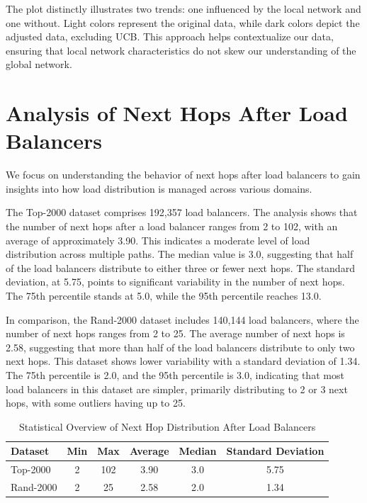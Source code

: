 \documentclass[12pt]{cwru_thesis}
\begin{document}
The plot distinctly illustrates two trends: one influenced by the local network and one without. Light colors represent the original data, while dark colors depict the adjusted data, excluding UCB. This approach helps contextualize our data, ensuring that local network characteristics do not skew our understanding of the global network.





\section{Analysis of Next Hops After Load Balancers}

We focus on understanding the behavior of next hops after load balancers to gain insights into how load distribution is managed across various domains. 

The Top-2000 dataset comprises 192,357 load balancers. The analysis shows that the number of next hops after a load balancer ranges from 2 to 102, with an average of approximately 3.90. This indicates a moderate level of load distribution across multiple paths. The median value is 3.0, suggesting that half of the load balancers distribute to either three or fewer next hops. The standard deviation, at 5.75, points to significant variability in the number of next hops. The 75th percentile stands at 5.0, while the 95th percentile reaches 13.0.

In comparison, the Rand-2000 dataset includes 140,144 load balancers, where the number of next hops ranges from 2 to 25. The average number of next hops is 2.58, suggesting that more than half of the load balancers distribute to only two next hops. This dataset shows lower variability with a standard deviation of 1.34. The 75th percentile is 2.0, and the 95th percentile is 3.0, indicating that most load balancers in this dataset are simpler, primarily distributing to 2 or 3 next hops, with some outliers having up to 25.

\begin{table}[h]
\centering
\begin{tabular}{|l|c|c|c|c|c|}
\hline
\textbf{Dataset} & \textbf{Min} & \textbf{Max} & \textbf{Average} & \textbf{Median} & \textbf{Standard Deviation} \\
\hline
Top-2000 & 2 & 102 & 3.90 & 3.0 & 5.75 \\
Rand-2000 & 2 & 25 & 2.58 & 2.0 & 1.34 \\
\hline
\end{tabular}
\caption{Statistical Overview of Next Hop Distribution After Load Balancers}
\label{tab:next_hop_stats}
\end{table}
\end{document}
